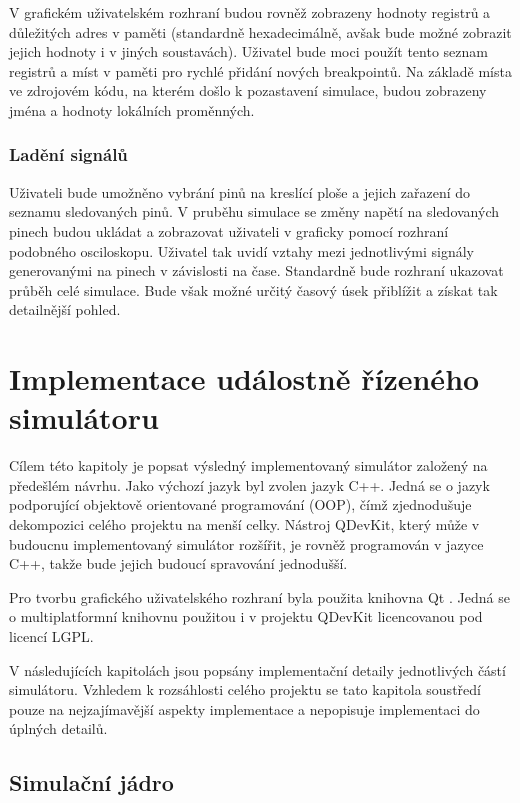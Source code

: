 V grafickém uživatelském rozhraní budou rovněž zobrazeny hodnoty registrů a důležitých adres v paměti (standardně hexadecimálně, avšak bude možné zobrazit jejich hodnoty i v jiných soustavách). Uživatel bude moci použít tento seznam registrů a míst v paměti pro rychlé přidání nových breakpointů. Na základě místa ve zdrojovém kódu, na kterém došlo k pozastavení simulace, budou zobrazeny jména a hodnoty lokálních proměnných.

\subsection{Ladění signálů}

Uživateli bude umožněno vybrání pinů na kreslící ploše a jejich zařazení do seznamu sledovaných pinů. V pruběhu simulace se změny napětí na sledovaných pinech budou ukládat a zobrazovat uživateli v graficky pomocí rozhraní podobného osciloskopu. Uživatel tak uvidí vztahy mezi jednotlivými signály generovanými na pinech v závislosti na čase. Standardně bude rozhraní ukazovat průběh celé simulace. Bude však možné určitý časový úsek přiblížit a získat tak detailnější pohled.

\chapter{Implementace událostně řízeného simulátoru}

Cílem této kapitoly je popsat výsledný implementovaný simulátor založený na předešlém návrhu. Jako výchozí jazyk byl zvolen jazyk C++. Jedná se o jazyk podporující objektově orientované programování (OOP), čímž zjednodušuje dekompozici celého projektu na menší celky. Nástroj QDevKit, který může v budoucnu implementovaný simulátor rozšířit, je rovněž programován v jazyce C++, takže bude jejich budoucí spravování jednodušší.

Pro tvorbu grafického uživatelského rozhraní byla použita knihovna Qt \cite{qt}. Jedná se o multiplatformní knihovnu použitou i v projektu QDevKit licencovanou pod licencí LGPL.

V následujících kapitolách jsou popsány implementační detaily jednotlivých částí simulátoru. Vzhledem k rozsáhlosti celého projektu se tato kapitola soustředí pouze na nejzajímavější aspekty implementace a nepopisuje implementaci do úplných detailů.

\section{Simulační jádro}

